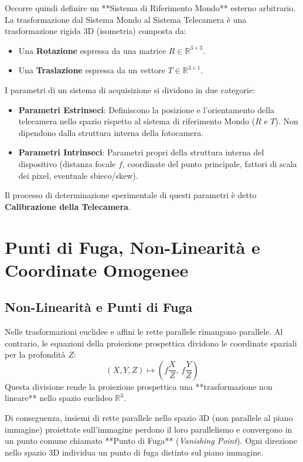 Occorre quindi definire un **Sistema di Riferimento Mondo** esterno arbitrario. La trasformazione dal Sistema Mondo al Sistema Telecamera è una trasformazione rigida $3\text{D}$ (isometria) composta da:
\begin{itemize}
    \item Una \textbf{Rotazione} espressa da una matrice $R \in \mathbb{R}^{3 \times 3}$.
    \item Una \textbf{Traslazione} espressa da un vettore $T \in \mathbb{R}^{3 \times 1}$.
\end{itemize}

I parametri di un sistema di acquisizione si dividono in due categorie:
\begin{itemize}
    \item \textbf{Parametri Estrinseci}: Definiscono la posizione e l'orientamento della telecamera nello spazio rispetto al sistema di riferimento Mondo ($R$ e $T$). Non dipendono dalla struttura interna della fotocamera.
    \item \textbf{Parametri Intrinseci}: Parametri propri della struttura interna del dispositivo (distanza focale $f$, coordinate del punto principale, fattori di scala dei pixel, eventuale sbieco/skew).
\end{itemize}

Il processo di determinazione sperimentale di questi parametri è detto \textbf{Calibrazione della Telecamera}.

\section{Punti di Fuga, Non-Linearità e Coordinate Omogenee}

\subsection{Non-Linearità e Punti di Fuga}
Nelle trasformazioni euclidee e affini le rette parallele rimangono parallele. Al contrario, le equazioni della proiezione prospettica dividono le coordinate spaziali per la profondità $Z$:
\begin{equation}
    (X, Y, Z) \longmapsto \left(f\frac{X}{Z}, \, f\frac{Y}{Z}\right)
\end{equation}
Questa divisione rende la proiezione prospettica una **trasformazione non lineare** nello spazio euclideo $\mathbb{R}^3$.

Di conseguenza, insiemi di rette parallele nello spazio $3\text{D}$ (non parallele al piano immagine) proiettate sull'immagine perdono il loro parallelismo e convergono in un punto comune chiamato **Punto di Fuga** (\textit{Vanishing Point}). Ogni direzione nello spazio $3\text{D}$ individua un punto di fuga distinto sul piano immagine.

